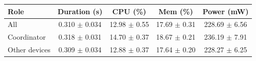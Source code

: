 \begin{tabular}{lcccc}
\hline
\textbf{Role} & \textbf{Duration (s)} & \textbf{CPU (\%)} & \textbf{Mem (\%)} & \textbf{Power (mW)} \\
\hline
All & 0.310 $\pm$ 0.034 & 12.98 $\pm$ 0.55 & 17.69 $\pm$ 0.31 & 228.69 $\pm$ 6.56 \\
Coordinator & 0.318 $\pm$ 0.031 & 14.70 $\pm$ 0.37 & 18.67 $\pm$ 0.21 & 236.19 $\pm$ 7.91 \\
Other devices & 0.309 $\pm$ 0.034 & 12.88 $\pm$ 0.37 & 17.64 $\pm$ 0.20 & 228.27 $\pm$ 6.25 \\
\hline
\end{tabular}
